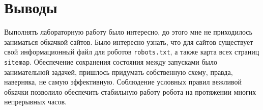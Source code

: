 \section{Выводы}
Выполнять лабораторную работу было интересно, до этого мне не приходилось заниматься обкачкой сайтов. Было интересно узнать, что для сайтов существует свой информационный файл для роботов \texttt{robots.txt}, а также карта всех страниц \texttt{sitemap}. Обеспечение сохранения состояния между запусками было занимательной задачей, пришлось придумать собственную схему, правда, наверняка, не самую эффективную. Соблюдение условных правил вежливой обкачки позволило обеспечить стабильную работу робота на протяжении многих непрерывных часов.

\pagebreak
